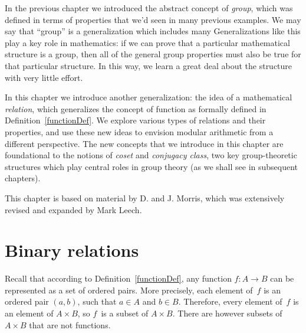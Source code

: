


\medskip\noindent

In the previous chapter we introduced the abstract concept of \emph{group}, which was defined in terms of properties that we'd seen in many previous examples. We may say that ``group'' is a generalization which includes many Generalizations like this play a key role in mathematics: if we can prove that a particular  mathematical structure is a group, then all  of the general group properties must also be true for that particular structure. In this way, we learn a great deal about the structure with very little effort.

In this chapter we introduce another generalization:  the idea of a mathematical \emph{relation}, which generalizes the concept of function as formally defined in Definition~\ref{functionDef}. We explore various types of relations and their properties, and use these new ideas to envision modular arithmetic from a different perspective. The new concepts that we introduce in this chapter are foundational to the notions of \emph{coset} and \emph{conjugacy  class}, two key group-theoretic structures which play central roles in group theory (as we shall see in subsequent chapters).
\medskip

This chapter  is based on material by  D. and J. Morris, which was extensively revised and expanded by Mark Leech.

\section{Binary relations \quad
{}} \label{sec.relation}

Recall that according to Definition~\ref{functionDef}, any function $f \colon A \to B$ can be represented as a set of ordered pairs. More precisely, each element of~$f$ is an ordered pair $(a,b)$, such that $a \in A$ and $b \in B$. Therefore, every element of~$f$ is an element of $A \times B$, so $f$~is a subset of $A \times B$.
There are however subsets of $A \times B$ that are not functions.


